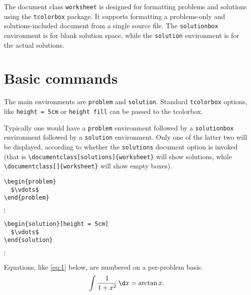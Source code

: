 \documentclass[julia,solutions]{worksheet}
\begin{document}

The document class \texttt{worksheet} is designed for formatting problems and solutions using the \texttt{tcolorbox} package. It supports formatting a problems-only and solutions-included document from a single source file. The \texttt{solutionbox} environment is for blank solution space, while the \texttt{solution} environment is for the actual solutions. 

\section{Basic commands}

The main environments are \texttt{problem} and \texttt{solution}. Standard \texttt{tcolorbox} options, like \texttt{height = 5cm} or \texttt{height fill} can be passed to the tcolorbox.

Typically one would have a \texttt{problem} environment followed by a \texttt{solutionbox} environment followed by a \texttt{solution} environment. Only one of the latter two will be displayed, according to whether the \texttt{solutions} document option is invoked (that is \texttt{\textbackslash documentclass[solutions]\{worksheet\}} will show solutions, while \texttt{\textbackslash documentclass[]\{worksheet\}} will show empty boxes). 

\begin{verbatim}
\begin{problem}
  $\vdots$
\end{problem}
\end{verbatim}

\begin{problem}
  $\vdots$
\end{problem}

\begin{verbatim} 
\begin{solution}[height = 5cm] 
  $\vdots$
\end{solution}
\end{verbatim}

\begin{solution}[height = 5cm] 
  $\vdots$
  
  Equations, like \eqref{eq:1} below, are numbered on a per-problem basis. 
  \begin{equation} \label{eq:1}
    \int \frac{1}{1+x^2} \, \d x = \arctan x. 
  \end{equation}
\end{solution}
\end{document}
